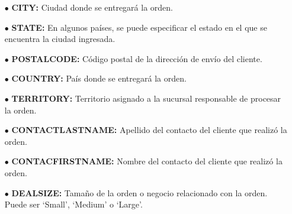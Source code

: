 \documentclass[a4paper]{article}
\begin{document}
\begin{itemize}
    \item [$\bullet$] \textbf{CITY:} Ciudad donde se entregará la orden.
    \item [$\bullet$] \textbf{STATE:} En algunos países, se puede especificar el estado en el que se encuentra la ciudad ingresada.
    \item [$\bullet$] \textbf{POSTALCODE:} Código postal de la dirección de envío del cliente.
    \item [$\bullet$] \textbf{COUNTRY:} País donde se entregará la orden.
    \item [$\bullet$] \textbf{TERRITORY:} Territorio asignado a la sucursal responsable de procesar la orden.
    \item [$\bullet$] \textbf{CONTACTLASTNAME:} Apellido del contacto del cliente que realizó la orden.
    \item [$\bullet$] \textbf{CONTACFIRSTNAME:} Nombre del contacto del cliente que realizó la orden.
    \item [$\bullet$] \textbf{DEALSIZE:} Tamaño de la orden o negocio relacionado con la orden. Puede ser `Small', `Medium' o `Large'.
  \end{itemize}
\end{document}
